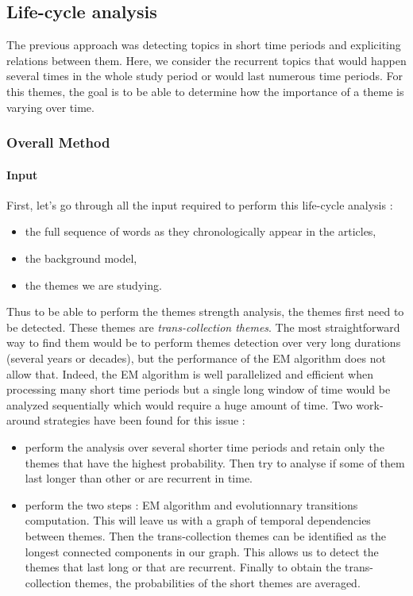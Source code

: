 \subsection{Life-cycle analysis}
The previous approach was detecting topics in short time periods and expliciting relations between them. Here, we consider the recurrent topics that would happen several times in the whole study period or would last numerous time periods. For this themes, the goal is to be able to determine how the importance of a theme is varying over time.

\subsubsection{Overall Method}

\paragraph{Input}
First, let's go through all the input required to perform this life-cycle analysis :
\begin{itemize}
\item the full sequence of words as they chronologically appear in the articles,
\item the background model,
\item the themes we are studying.

\end{itemize}

Thus to be able to perform the themes strength analysis, the themes first need to be detected. These themes are \emph{trans-collection themes}. The most straightforward way to find them would be to perform themes detection over very long durations (several years or decades), but the performance of the EM algorithm does not allow that. Indeed, the EM algorithm is well parallelized and efficient when processing many short time periods but a single long window of time would be analyzed sequentially which would require a huge amount of time. Two work-around strategies have been found for this issue :
\begin{itemize}
\item perform the analysis over several shorter time periods and retain only the themes that have the highest probability. Then try to analyse if some of them last longer than other or are recurrent in time.
\item perform the two steps  : EM algorithm and evolutionnary transitions computation. This will leave us with a graph of temporal dependencies between themes. Then the trans-collection themes can be identified as the longest connected components in our graph. This allows us to detect the themes that last long or that are recurrent. Finally to obtain the trans-collection themes, the probabilities of the short themes are averaged.
\end{itemize}

